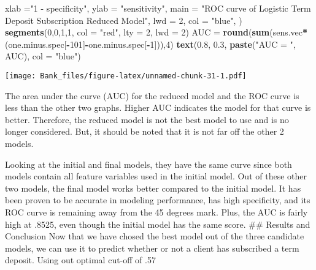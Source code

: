 \documentclass[
]{article}
\newenvironment{Shaded}{\begin{snugshade}}{\end{snugshade}}
\newcommand{\AttributeTok}[1]{\textcolor[rgb]{0.13,0.29,0.53}{#1}}
\newcommand{\DecValTok}[1]{\textcolor[rgb]{0.00,0.00,0.81}{#1}}
\newcommand{\FloatTok}[1]{\textcolor[rgb]{0.00,0.00,0.81}{#1}}
\newcommand{\FunctionTok}[1]{\textcolor[rgb]{0.13,0.29,0.53}{\textbf{#1}}}
\newcommand{\NormalTok}[1]{#1}
\newcommand{\OtherTok}[1]{\textcolor[rgb]{0.56,0.35,0.01}{#1}}
\newcommand{\SpecialCharTok}[1]{\textcolor[rgb]{0.81,0.36,0.00}{\textbf{#1}}}
\newcommand{\StringTok}[1]{\textcolor[rgb]{0.31,0.60,0.02}{#1}}
\begin{document}
\begin{Shaded}
\begin{Highlighting}[]
     \AttributeTok{xlab =}\StringTok{"1 {-} specificity"}\NormalTok{,}
     \AttributeTok{ylab =} \StringTok{"sensitivity"}\NormalTok{,}
     \AttributeTok{main =} \StringTok{"ROC curve of Logistic Term Deposit Subscription Reduced Model"}\NormalTok{,}
     \AttributeTok{lwd =} \DecValTok{2}\NormalTok{,}
     \AttributeTok{col =} \StringTok{"blue"}\NormalTok{, )}
\FunctionTok{segments}\NormalTok{(}\DecValTok{0}\NormalTok{,}\DecValTok{0}\NormalTok{,}\DecValTok{1}\NormalTok{,}\DecValTok{1}\NormalTok{, }\AttributeTok{col =} \StringTok{"red"}\NormalTok{, }\AttributeTok{lty =} \DecValTok{2}\NormalTok{, }\AttributeTok{lwd =} \DecValTok{2}\NormalTok{)}
\NormalTok{AUC }\OtherTok{=} \FunctionTok{round}\NormalTok{(}\FunctionTok{sum}\NormalTok{(sens.vec}\SpecialCharTok{*}\NormalTok{(one.minus.spec[}\SpecialCharTok{{-}}\DecValTok{101}\NormalTok{]}\SpecialCharTok{{-}}\NormalTok{one.minus.spec[}\SpecialCharTok{{-}}\DecValTok{1}\NormalTok{])),}\DecValTok{4}\NormalTok{)}
\FunctionTok{text}\NormalTok{(}\FloatTok{0.8}\NormalTok{, }\FloatTok{0.3}\NormalTok{, }\FunctionTok{paste}\NormalTok{(}\StringTok{"AUC = "}\NormalTok{, AUC), }\AttributeTok{col =} \StringTok{"blue"}\NormalTok{)}
\end{Highlighting}
\end{Shaded}

\texttt{[image: Bank\_files/figure-latex/unnamed-chunk-31-1.pdf]}

The area under the curve (AUC) for the reduced model and the ROC curve
is less than the other two graphs. Higher AUC indicates the model for
that curve is better. Therefore, the reduced model is not the best model
to use and is no longer considered. But, it should be noted that it is
not far off the other 2 models.

Looking at the initial and final models, they have the same curve since
both models contain all feature variables used in the initial model. Out
of these other two models, the final model works better compared to the
initial model. It has been proven to be accurate in modeling
performance, has high specificity, and its ROC curve is remaining away
from the 45 degrees mark. Plus, the AUC is fairly high at .8525, even
though the initial model has the same score. \#\# Results and Conclusion
Now that we have chosed the best model out of the three candidate
models, we can use it to predict whether or not a client has subscribed
a term deposit. Using out optimal cut-off of .57
\end{document}
